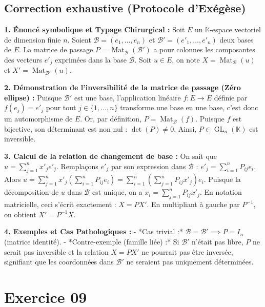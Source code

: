 \documentclass{report}
\begin{document}
\subsection*{Correction exhaustive (Protocole d'Exégèse)}

\textbf{1. Énoncé symbolique et Typage Chirurgical :}
Soit $E$ un $\mathbb{K}$-espace vectoriel de dimension finie $n$. Soient $\mathcal{B} = (e_1, \dots, e_n)$ et $\mathcal{B}' = (e'_1, \dots, e'_n)$ deux bases de $E$.
La matrice de passage $P = \operatorname{Mat}_{\mathcal{B}}(\mathcal{B}')$ a pour colonnes les composantes des vecteurs $e'_j$ exprimées dans la base $\mathcal{B}$.
Soit $u \in E$, on note $X = \operatorname{Mat}_{\mathcal{B}}(u)$ et $X' = \operatorname{Mat}_{\mathcal{B}'}(u)$.

\textbf{2. Démonstration de l'inversibilité de la matrice de passage (Zéro ellipse) :}
Puisque $\mathcal{B}'$ est une base, l'application linéaire $f : E \to E$ définie par $f(e_j) = e'_j$ pour tout $j \in \{1, \dots, n\}$ transforme une base en une base, c'est donc un automorphisme de $E$.
Or, par définition, $P = \operatorname{Mat}_{\mathcal{B}}(f)$.
Puisque $f$ est bijective, son déterminant est non nul : $\det(P) \neq 0$.
Ainsi, $P \in \operatorname{GL}_n(\mathbb{K})$ est inversible.

\textbf{3. Calcul de la relation de changement de base :}
On sait que $u = \sum_{j=1}^n x'_j e'_j$.
Remplaçons $e'_j$ par son expression dans $\mathcal{B}$ : $e'_j = \sum_{i=1}^n P_{ij} e_i$.
Alors $u = \sum_{j=1}^n x'_j \left( \sum_{i=1}^n P_{ij} e_i \right) = \sum_{i=1}^n \left( \sum_{j=1}^n P_{ij} x'_j \right) e_i$.
Puisque la décomposition de $u$ dans $\mathcal{B}$ est unique, on a $x_i = \sum_{j=1}^n P_{ij} x'_j$.
En notation matricielle, ceci s'écrit exactement : $X = P X'$.
En multipliant à gauche par $P^{-1}$, on obtient $X' = P^{-1} X$.

\textbf{4. Exemples et Cas Pathologiques :}
- *Cas trivial :* $\mathcal{B} = \mathcal{B}' \implies P = I_n$ (matrice identité).
- *Contre-exemple (famille liée) :* Si $\mathcal{B}'$ n'était pas libre, $P$ ne serait pas inversible et la relation $X = P X'$ ne pourrait pas être inversée, signifiant que les coordonnées dans $\mathcal{B}'$ ne seraient pas uniquement déterminées.


\section*{Exercice 09}
\end{document}
